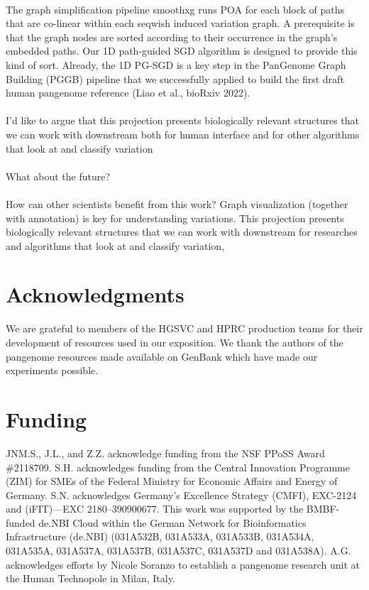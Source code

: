 \documentclass{bioinfo}
\theoremstyle{definition}
\begin{document}
\paragraph{}
The graph simplification pipeline smoothxg runs POA for each block of paths that are co-linear within each seqwish induced variation graph.
A prerequisite is that the graph nodes are sorted according to their occurrence in the graph's embedded paths.
Our 1D path-guided SGD algorithm is designed to provide this kind of sort.
Already, the 1D PG-SGD is a key step in the PanGenome Graph Building (PGGB) pipeline that we successfully applied to build the first draft human pangenome reference (Liao et al., bioRxiv 2022).
\paragraph{}
I'd like to argue that this projection presents biologically relevant structures that we can work with downstream
both for human interface
and for other algorithms that look at and classify variation
\paragraph{}
What about the future?
\paragraph{}
How can other scientists benefit from this work?
Graph visualization (together with annotation) is key for understanding variations.
This projection presents biologically relevant structures that we can work with downstream for researches and algorithms that look at and classify variation,

\section*{Acknowledgments}

We are grateful to members of the HGSVC and HPRC production teams for their development of resources used in our exposition.
We thank the authors of the pangenome resources made available on GenBank which have made our experiments possible.

\section*{Funding}

JNM.S., J.L., and Z.Z. acknowledge funding from the NSF PPoSS Award \#2118709.
S.H. acknowledges funding from the Central Innovation Programme (ZIM) for SMEs of the Federal Ministry for Economic Affairs and Energy of Germany.
S.N. acknowledges Germany’s Excellence Strategy (CMFI), EXC-2124 and (iFIT)—EXC 2180–390900677.
This work was supported by the BMBF-funded de.NBI Cloud within the German Network for Bioinformatics Infrastructure (de.NBI) (031A532B, 031A533A, 031A533B, 031A534A, 031A535A, 031A537A, 031A537B, 031A537C, 031A537D and 031A538A).
A.G. acknowledges efforts by Nicole Soranzo to establish a pangenome research unit at the Human Technopole in Milan, Italy.
\end{document}
